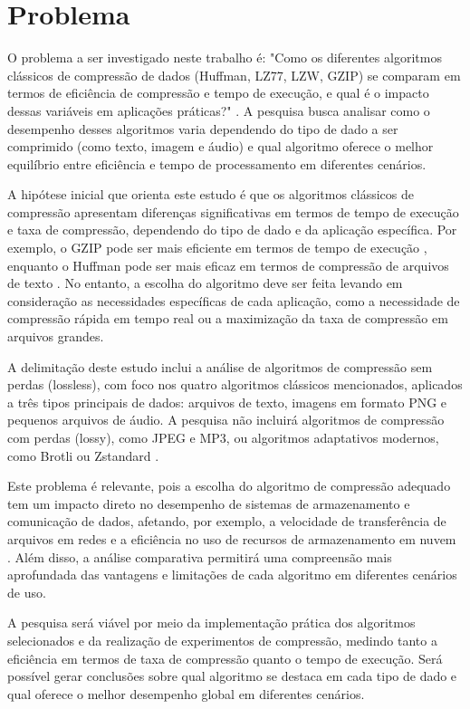 \chapter{Problema}
\label{c.problema}

O problema a ser investigado neste trabalho é: "Como os diferentes algoritmos clássicos de compressão de dados (Huffman, LZ77, LZW, GZIP) se comparam em termos de eficiência de compressão e tempo de execução, e qual é o impacto dessas variáveis em aplicações práticas?" \cite{salomon2007data}. A pesquisa busca analisar como o desempenho desses algoritmos varia dependendo do tipo de dado a ser comprimido (como texto, imagem e áudio) e qual algoritmo oferece o melhor equilíbrio entre eficiência e tempo de processamento em diferentes cenários.

A hipótese inicial que orienta este estudo é que os algoritmos clássicos de compressão apresentam diferenças significativas em termos de tempo de execução e taxa de compressão, dependendo do tipo de dado e da aplicação específica. Por exemplo, o GZIP pode ser mais eficiente em termos de tempo de execução \cite{deutsch1996gzip}, enquanto o Huffman pode ser mais eficaz em termos de compressão de arquivos de texto \cite{salomon2007data}. No entanto, a escolha do algoritmo deve ser feita levando em consideração as necessidades específicas de cada aplicação, como a necessidade de compressão rápida em tempo real ou a maximização da taxa de compressão em arquivos grandes.

A delimitação deste estudo inclui a análise de algoritmos de compressão sem perdas (lossless), com foco nos quatro algoritmos clássicos mencionados, aplicados a três tipos principais de dados: arquivos de texto, imagens em formato PNG e pequenos arquivos de áudio. A pesquisa não incluirá algoritmos de compressão com perdas (lossy), como JPEG e MP3, ou algoritmos adaptativos modernos, como Brotli \cite{alakuijala2016brotli} ou Zstandard \cite{collet2016zstandard}.

Este problema é relevante, pois a escolha do algoritmo de compressão adequado tem um impacto direto no desempenho de sistemas de armazenamento e comunicação de dados, afetando, por exemplo, a velocidade de transferência de arquivos em redes e a eficiência no uso de recursos de armazenamento em nuvem \cite{deutsch1996gzip}. Além disso, a análise comparativa permitirá uma compreensão mais aprofundada das vantagens e limitações de cada algoritmo em diferentes cenários de uso.

A pesquisa será viável por meio da implementação prática dos algoritmos selecionados e da realização de experimentos de compressão, medindo tanto a eficiência em termos de taxa de compressão quanto o tempo de execução. Será possível gerar conclusões sobre qual algoritmo se destaca em cada tipo de dado e qual oferece o melhor desempenho global em diferentes cenários.

